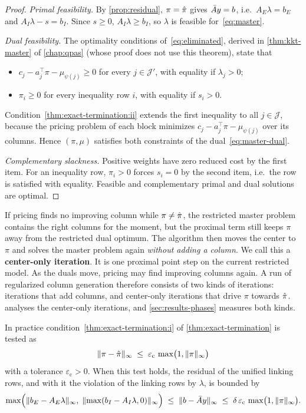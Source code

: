 \begin{proof}
\emph{Primal feasibility.} By \cref{prop:residual}, $\pi = \hat{\pi}$ gives $\bar{A} y = b$, i.e.\
$A_E\lambda = b_E$ and $A_I\lambda - s = b_I$. Since $s\ge0$, $A_I\lambda\ge b_I$, so $\lambda$
is feasible for~\eqref{eq:master}.

\emph{Dual feasibility.} The optimality conditions of~\eqref{eq:eliminated}, derived in
\cref{thm:kkt-master} of \cref{chap:qpas} (whose proof does not use this theorem), state that
\begin{itemize}
    \item $c_j - a_j^\top\pi - \mu_{\psi(j)}\ge0$ for every $j\in\mathcal{J}'$, with equality if
          $\lambda_j>0$;
    \item $\pi_i\ge0$ for every inequality row $i$, with equality if $s_i>0$.
\end{itemize}
Condition~\ref{thm:exact-termination:ii} extends the first inequality to all $j\in\mathcal{J}$, because the pricing
problem of each block minimizes $c_j - a_j^\top\pi - \mu_{\psi(j)}$ over its columns. Hence
$(\pi,\mu)$ satisfies both constraints of the dual~\eqref{eq:master-dual}.

\emph{Complementary slackness.} Positive weights have zero reduced cost by the first item. For
an inequality row, $\pi_i>0$ forces $s_i = 0$ by the second item, i.e.\ the row is satisfied
with equality. Feasible and complementary primal and dual solutions are optimal.
\end{proof}

If pricing finds no improving column while $\pi\ne\hat{\pi}$, the restricted master problem
contains the right columns for the moment, but the proximal term still keeps $\pi$ away from
the restricted dual optimum. The algorithm then moves the center to $\pi$ and solves the
master problem again \emph{without adding a column}. We call this a
\textbf{center-only iteration}. It is one proximal point step on the current restricted
model. As the duals move, pricing may find improving columns again. A run of regularized
column generation therefore consists of two kinds of iterations: iterations that add
columns, and center-only iterations that drive $\pi$ towards $\hat{\pi}$.
\Cref{prop:center-only} analyses the center-only iterations, and \cref{sec:results-phases}
measures both kinds.

\begin{prop} \label{prop:stop-accuracy}
In practice condition~\ref{thm:exact-termination:i} of \cref{thm:exact-termination} is tested as
\begin{equation} \label{eq:center-test}
\lVert\pi - \hat{\pi}\rVert_\infty \;\le\; \varepsilon_{\mathrm{c}}\,\max\bigl(1,\lVert\pi\rVert_\infty\bigr)
\end{equation}
with a tolerance $\varepsilon_{\mathrm{c}}>0$. When this test holds, the residual of the
unified linking rows, and with it the violation of the linking rows by $\lambda$, is bounded by
\[
\max\Bigl(\lVert b_E - A_E\lambda\rVert_\infty,\;\lVert\max(b_I - A_I\lambda, 0)\rVert_\infty\Bigr)
\;\le\;\lVert b - \bar{A} y\rVert_\infty \;\le\; \delta\,\varepsilon_{\mathrm{c}}\,\max\bigl(1,\lVert\pi\rVert_\infty\bigr).
\]
\end{prop}

